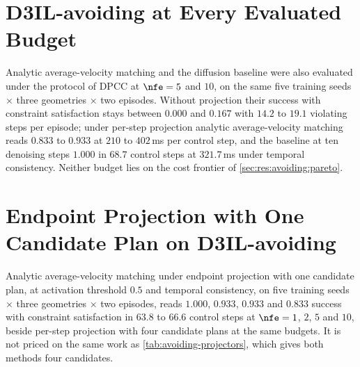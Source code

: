 
\section{D3IL-avoiding at Every Evaluated Budget}\label{app:avoiding-budgets}

Analytic average-velocity matching and the diffusion baseline were also evaluated under the protocol
of \ac{DPCC} at $\nfe = 5$ and $10$, on the same five training seeds $\times$ three geometries $\times$
two episodes. Without projection their success with constraint satisfaction stays between $0.000$ and
$0.167$ with $14.2$ to $19.1$ violating steps per episode; under per-step projection analytic
average-velocity matching reads $0.833$ to $0.933$ at $210$ to $402$\,ms per control step, and the
baseline at ten denoising steps $1.000$ in $68.7$ control steps at $321.7$\,ms under temporal
consistency. Neither budget lies on the cost frontier of \autoref{sec:res:avoiding:pareto}.
\ifappendixfull

\else
\label{tab:app:avoiding-raw-full}\label{tab:app:avoiding-dpcc-full}
\fi

\section{Endpoint Projection with One Candidate Plan on D3IL-avoiding}\label{app:avoiding-endpoint-ladder}

Analytic average-velocity matching under endpoint projection with one candidate plan, at activation
threshold $0.5$ and temporal consistency, on five training seeds $\times$ three geometries $\times$ two
episodes, reads $1.000$, $0.933$, $0.933$ and $0.833$ success with constraint satisfaction in $63.8$ to
$66.6$ control steps at $\nfe = 1$, $2$, $5$ and $10$, beside per-step projection with four candidate
plans at the same budgets. It is not priced on the same work as \autoref{tab:avoiding-projectors},
which gives both methods four candidates.
\ifappendixfull

\else
\label{tab:app:hf-ladder-detail}
\fi


